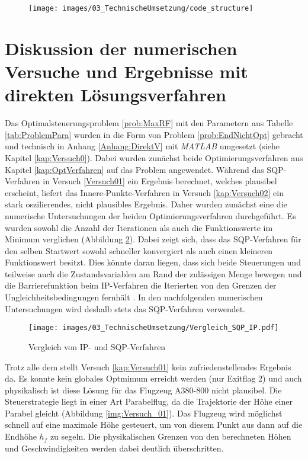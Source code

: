 \begin{figure}[H]
    \centering
    \texttt{[image: images/03\_TechnischeUmsetzung/code\_structure]}
    \label{fig:code_structure}
\end{figure}


\section{Diskussion der numerischen Versuche und Ergebnisse mit direkten Lösungsverfahren}
Das Optimalsteuerungsproblem \ref{prob:MaxRF} mit den Parametern aus Tabelle \ref{tab:ProblemPara} wurden in die Form von Problem \ref{prob:EndNichtOpt} gebracht und technisch in Anhang \ref{Anhang:DirektV} mit \textit{MATLAB} umgesetzt (siehe Kapitel \ref{kap:Versuch0}). Dabei wurden zunächst beide Optimierungsverfahren aus Kapitel \ref{kap:OptVerfahren} auf das Problem angewendet. Während das SQP-Verfahren in Versuch \ref{Versuch01} ein Ergebnis berechnet, welches plausibel erscheint, liefert das Innere-Punkte-Verfahren in Versuch \ref{kap:Versuch02} ein stark oszilierendes, nicht plausibles Ergebnis. Daher wurden zunächst eine die numerische Untersuchungen der beiden Optimierungsverfahren durchgeführt. Es wurden sowohl die Anzahl der Iterationen als auch die Funktionswerte im Minimum verglichen (Abbildung \ref{img:Vergleich_SQP_IP}). Dabei zeigt sich, dass das SQP-Verfahren für den selben Startwert sowohl schneller konvergiert als auch einen kleineren Funktionswert besitzt. Dies könnte daran liegen, dass sich beide Steuerungen und teilweise auch die Zustandsvariablen am Rand der zulässigen Menge bewegen und die Barrierefunktion beim IP-Verfahren die Iterierten von den Grenzen der Ungleichheitsbedingungen fernhält \cite{Matlab2016}. In den nachfolgenden numerischen Untersuchungen wird deshalb stets das SQP-Verfahren verwendet.
\begin{figure}[H]
    \begin{center}
        \texttt{[image: images/03\_TechnischeUmsetzung/Vergleich\_SQP\_IP.pdf]}
        \caption{Vergleich von IP- und SQP-Verfahren}\label{img:Vergleich_SQP_IP}
    \end{center}
\end{figure}
Trotz alle dem stellt Versuch \ref{kap:Versuch01} kein zufriedenstellendes Ergebnis da. Es konnte kein globales Optmimum erreicht werden (nur Exitflag 2) und auch physikalisch ist diese Lösung für das Flugzeug A380-800 nicht plausibel. Die Steuerstrategie liegt in einer Art Parabelflug, da die Trajektorie der Höhe einer Parabel gleicht (Abbildung \ref{img:Versuch_01}). Das Flugzeug wird möglichst schnell auf eine maximale Höhe gesteuert, um von diesem Punkt aus dann auf die Endhöhe $h_f$ zu segeln. Die physikalischen Grenzen von den berechneten Höhen und Geschwindigkeiten werden dabei deutlich überschritten.

